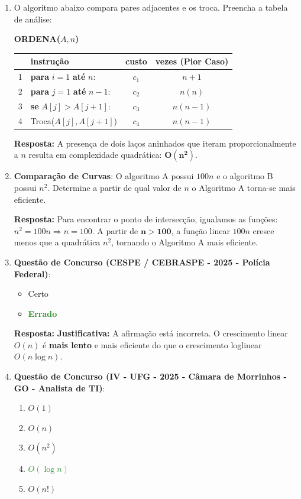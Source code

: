 \documentclass[12pt]{article}
\newcommand{\quadro}[1]{\vspace{0.2cm}\begin{tcolorbox}[colback=green!5, colframe=forestgreen, boxrule=0.5pt, arc=0pt] \textbf{Resposta:} #1 \end{tcolorbox}}
\begin{document}
\begin{enumerate}[label=\arabic*), leftmargin=1.5cm, itemsep=0.8cm]
    \item O algoritmo abaixo compara pares adjacentes e os troca. Preencha a tabela de análise:
    \begin{tcolorbox}[colback=white, colframe=black, fontupper=\small]
        \textbf{ORDENA($A, n$)} \\
        \begin{tabular}{llcc}
            \hline
            & \textbf{instrução} & \textbf{custo} & \textbf{vezes} (Pior Caso) \\
            \hline
            1 & \textbf{para} $i = 1$ \textbf{até} $n$: & $c_1$ & $n+1$ \\
            2 & \quad \textbf{para} $j = 1$ \textbf{até} $n - 1$: & $c_2$ & $n(n)$ \\
            3 & \quad \quad \textbf{se} $A[j] > A[j+1]$: & $c_3$ & $n(n-1)$ \\
            4 & \quad \quad \quad Troca($A[j], A[j+1]$) & $c_4$ & $n(n-1)$ \\
            \hline
        \end{tabular}
    \end{tcolorbox}
    \quadro{A presença de dois laços aninhados que iteram proporcionalmente a $n$ resulta em complexidade quadrática: $\mathbf{O(n^2)}$.}

    \item \textbf{Comparação de Curvas}: O algoritmo A possui $100n$ e o algoritmo B possui $n^2$. Determine a partir de qual valor de $n$ o Algoritmo A torna-se mais eficiente.
    \quadro{Para encontrar o ponto de intersecção, igualamos as funções: $n^2 = 100n \Rightarrow n = 100$. A partir de $\mathbf{n > 100}$, a função linear $100n$ cresce menos que a quadrática $n^2$, tornando o Algoritmo A mais eficiente.}

    \item \textbf{Questão de Concurso (CESPE / CEBRASPE - 2025 - Polícia Federal)}: 
    \begin{itemize}
        \item[($\quad$)] Certo
        \item[(\textcolor{forestgreen}{\textbf{X}})] \textcolor{forestgreen}{\textbf{Errado}}
    \end{itemize}
    \quadro{\textbf{Justificativa:} A afirmação está incorreta. O crescimento linear $O(n)$ é \textbf{mais lento} e mais eficiente do que o crescimento loglinear $O(n \log n)$.}

    \item \textbf{Questão de Concurso (IV - UFG - 2025 - Câmara de Morrinhos - GO - Analista de TI)}:
    \begin{enumerate}[label=\Alph*)]
        \item $O(1)$
        \item $O(n)$
        \item $O(n^2)$
        \item[\textcolor{forestgreen}{\textbf{D)}}] \textcolor{forestgreen}{\textbf{$O(\log n)$}}
        \item $O(n!)$
    \end{enumerate}


\end{enumerate}
\end{document}

